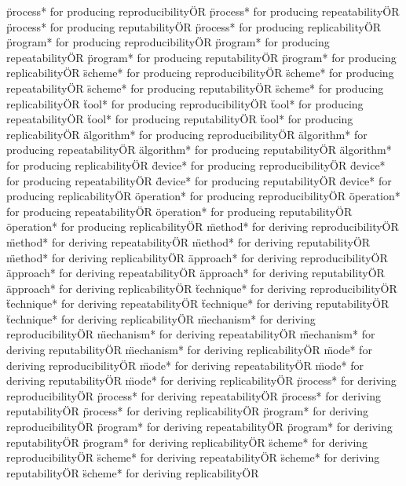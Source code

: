 \documentclass[
10pt, %
a4paper, %
oneside, %
headinclude,footinclude, %
BCOR5mm, %
]{scrartcl}
\begin{document}
\"process* for producing reproducibility\" OR \"process* for producing repeatability\" OR \"process* for producing reputability\" OR \"process* for producing replicability\" OR 
\"program* for producing reproducibility\" OR \"program* for producing repeatability\" OR \"program* for producing reputability\" OR \"program* for producing replicability\" OR 
\"scheme* for producing reproducibility\" OR \"scheme* for producing repeatability\" OR \"scheme* for producing reputability\" OR \"scheme* for producing replicability\" OR 
\"tool* for producing reproducibility\" OR \"tool* for producing repeatability\" OR \"tool* for producing reputability\" OR \"tool* for producing replicability\" OR 
\"algorithm* for producing reproducibility\" OR \"algorithm* for producing repeatability\" OR \"algorithm* for producing reputability\" OR \"algorithm* for producing replicability\" OR 
\"device* for producing reproducibility\" OR \"device* for producing repeatability\" OR \"device* for producing reputability\" OR \"device* for producing replicability\" OR 
\"operation* for producing reproducibility\" OR \"operation* for producing repeatability\" OR \"operation* for producing reputability\" OR \"operation* for producing replicability\" OR 
\"method* for deriving reproducibility\" OR \"method* for deriving repeatability\" OR \"method* for deriving reputability\" OR \"method* for deriving replicability\" OR 
\"approach* for deriving reproducibility\" OR \"approach* for deriving repeatability\" OR \"approach* for deriving reputability\" OR \"approach* for deriving replicability\" OR 
\"technique* for deriving reproducibility\" OR \"technique* for deriving repeatability\" OR \"technique* for deriving reputability\" OR \"technique* for deriving replicability\" OR 
\"mechanism* for deriving reproducibility\" OR \"mechanism* for deriving repeatability\" OR \"mechanism* for deriving reputability\" OR \"mechanism* for deriving replicability\" OR 
\"mode* for deriving reproducibility\" OR \"mode* for deriving repeatability\" OR \"mode* for deriving reputability\" OR \"mode* for deriving replicability\" OR 
\"process* for deriving reproducibility\" OR \"process* for deriving repeatability\" OR \"process* for deriving reputability\" OR \"process* for deriving replicability\" OR 
\"program* for deriving reproducibility\" OR \"program* for deriving repeatability\" OR \"program* for deriving reputability\" OR \"program* for deriving replicability\" OR 
\"scheme* for deriving reproducibility\" OR \"scheme* for deriving repeatability\" OR \"scheme* for deriving reputability\" OR \"scheme* for deriving replicability\" OR 
\end{document}
